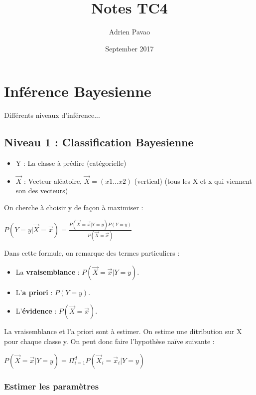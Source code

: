 \documentclass{article}
\title{Notes TC4}
\author{Adrien Pavao}
\date{September 2017}
\begin{document}
\maketitle

\tableofcontents

\section{Inférence Bayesienne}

Différents niveaux d'inférence...

\subsection{Niveau 1 : Classification Bayesienne}

\begin{itemize}
\item Y : La classe à prédire (catégorielle)
\item $\vec{X}$ : Vecteur aléatoire, $\vec{X} = (x1 ... x2)$ (vertical) (tous les X et x qui viennent son des vecteurs)
\end{itemize}

On cherche à choisir y de façon à maximiser : 

$ P(Y=y | \vec{X} = \vec{x}) = \frac{P(\vec{X} = \vec{x} | Y=y)P(Y=y)}{P(\vec{X} = \vec{x})}  $

Dans cette formule, on remarque des termes particuliers : 

\begin{itemize}

\item La \textbf{vraisemblance} : $P(\vec{X} = \vec{x} | Y = y)$.
\item L'\textbf{a priori} : $P(Y = y)$.
\item L'\textbf{évidence} : $P(\vec{X} = \vec{x})$.

\end{itemize}

La vraisemblance et l'a priori sont à estimer. On estime une ditribution sur X pour chaque classe y.
On peut donc faire l'hypothèse naïve suivante : 

$P(\vec{X}=\vec{x} | Y=y) = \Pi_{i=1}^{d} P(\vec{X}_i = \vec{x}_i | Y = y)$

\subsubsection*{Estimer les paramètres}
\end{document}
